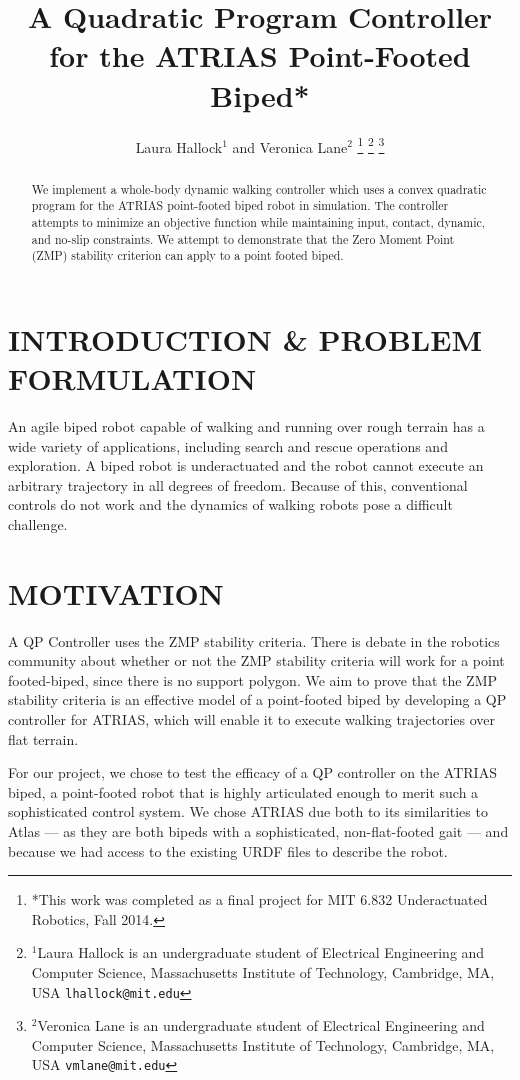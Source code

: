 \documentclass[letterpaper, 10 pt, conference]{ieeeconf}  %
\title{\LARGE \bf
A Quadratic Program Controller for the ATRIAS Point-Footed Biped*
}
\author{Laura Hallock$^{1}$ and Veronica Lane$^{2}$%
\thanks{*This work was completed as a final project for MIT 6.832 Underactuated Robotics, Fall 2014.}%
\thanks{$^{1}$Laura Hallock is an undergraduate student of Electrical Engineering and Computer Science,
        Massachusetts Institute of Technology, Cambridge, MA, USA
        {\tt\small lhallock@mit.edu}}%
\thanks{$^{2}$Veronica Lane is an undergraduate student of Electrical Engineering and Computer Science,
        Massachusetts Institute of Technology, Cambridge, MA, USA
        {\tt\small vmlane@mit.edu}}%
}
\begin{document}
\maketitle
\thispagestyle{empty}
\pagestyle{empty}


\begin{abstract}

We implement a whole-body dynamic walking controller which uses a convex quadratic program for the ATRIAS point-footed biped robot in simulation. The controller attempts to minimize an objective function while maintaining input, contact, dynamic, and no-slip constraints. We attempt to demonstrate that the Zero Moment Point (ZMP) stability criterion can apply to a point footed biped.

\end{abstract}


\section{INTRODUCTION \& PROBLEM FORMULATION}

An agile biped robot capable of walking and running over rough terrain has a wide variety of applications, including search and rescue operations and exploration. A biped robot is underactuated and the robot cannot execute an arbitrary trajectory in all degrees of freedom. Because of this, conventional controls do not work and the dynamics of walking robots pose a difficult challenge.

\section{MOTIVATION}

A QP Controller uses the ZMP stability criteria. There is debate in the robotics community about whether or not the ZMP stability criteria will work for a point footed-biped, since there is no support polygon. We aim to prove that the ZMP stability criteria is an effective model of a point-footed biped by developing a QP controller for ATRIAS, which will enable it to execute walking trajectories over flat terrain.

For our project, we chose to test the efficacy of a QP controller on the ATRIAS biped, a point-footed robot that is highly articulated enough to merit such a sophisticated control system. We chose ATRIAS due both to its similarities to Atlas --- as they are both bipeds with a sophisticated, non-flat-footed gait --- and because we had access to the existing URDF files to describe the robot.
\end{document}
